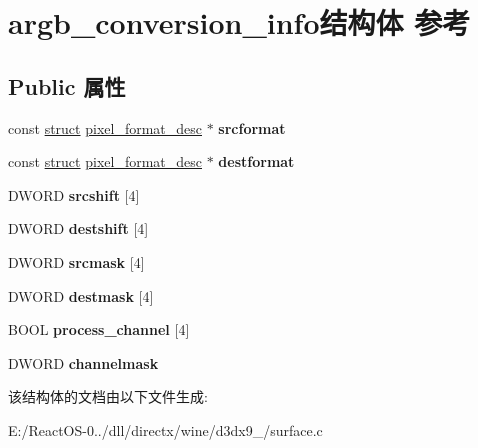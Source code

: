 \hypertarget{structargb__conversion__info}{}\section{argb\+\_\+conversion\+\_\+info结构体 参考}
\label{structargb__conversion__info}
\subsection*{Public 属性}
\begin{DoxyCompactItemize}
\item 
\mbox{\label{structargb__conversion__info_aecc9089bfa79764816a7d99a68b18a99}} 
const \hyperlink{interfacestruct}{struct} \hyperlink{structpixel__format__desc}{pixel\+\_\+format\+\_\+desc} $\ast$ {\bfseries srcformat}
\item 
\mbox{\label{structargb__conversion__info_a169705114c87c4917e6214e37f3248ed}} 
const \hyperlink{interfacestruct}{struct} \hyperlink{structpixel__format__desc}{pixel\+\_\+format\+\_\+desc} $\ast$ {\bfseries destformat}
\item 
\mbox{\label{structargb__conversion__info_adc9748eba6dbafd3cd24afc4ff12a85b}} 
D\+W\+O\+RD {\bfseries srcshift} \mbox{[}4\mbox{]}
\item 
\mbox{\label{structargb__conversion__info_a49e69e8124b2d5531dfa12b6732e8403}} 
D\+W\+O\+RD {\bfseries destshift} \mbox{[}4\mbox{]}
\item 
\mbox{\label{structargb__conversion__info_ab542dc0aaf9633c7ecfda476ec662d49}} 
D\+W\+O\+RD {\bfseries srcmask} \mbox{[}4\mbox{]}
\item 
\mbox{\label{structargb__conversion__info_a0a14ed99906c88a4e34d362427eaa821}} 
D\+W\+O\+RD {\bfseries destmask} \mbox{[}4\mbox{]}
\item 
\mbox{\label{structargb__conversion__info_a392ae9fb08117e2327196265be3da5d6}} 
B\+O\+OL {\bfseries process\+\_\+channel} \mbox{[}4\mbox{]}
\item 
\mbox{\label{structargb__conversion__info_ad4e93959243df025168e1e4b77388596}} 
D\+W\+O\+RD {\bfseries channelmask}
\end{DoxyCompactItemize}


该结构体的文档由以下文件生成\+:\begin{DoxyCompactItemize}
\item 
E\+:/\+React\+O\+S-\/0../dll/directx/wine/d3dx9\+\_/surface.\+c\end{DoxyCompactItemize}
